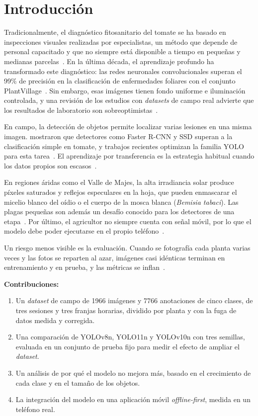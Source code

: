 \documentclass[sensors,article,submit,pdftex,moreauthors]{Definitions/mdpi}
\begin{document}
\section{Introducción}

Tradicionalmente, el diagnóstico fitosanitario del tomate se ha basado en inspecciones visuales realizadas por especialistas, un método que depende de personal capacitado y que no siempre está disponible a tiempo en pequeñas y medianas parcelas~\cite{SENASA2020}. En la última década, el aprendizaje profundo ha transformado este diagnóstico: las redes neuronales convolucionales superan el 99\% de precisión en la clasificación de enfermedades foliares con el conjunto PlantVillage~\cite{Mohanty2016}. Sin embargo, esas imágenes tienen fondo uniforme e iluminación controlada, y una revisión de los estudios con \emph{datasets} de campo real advierte que los resultados de laboratorio son sobreoptimistas~\cite{Jelali2024}.

En campo, la detección de objetos permite localizar varias lesiones en una misma imagen. \citet{Fuentes2017} mostraron que detectores como Faster R-CNN y SSD superan a la clasificación simple en tomate, y trabajos recientes optimizan la familia YOLO para esta tarea~\cite{Zhong2024,Wang2025}. El aprendizaje por transferencia es la estrategia habitual cuando los datos propios son escasos~\cite{Mengesha2025,Yadav2025}.

En regiones áridas como el Valle de Majes, la alta irradiancia solar produce píxeles saturados y reflejos especulares en la hoja, que pueden enmascarar el micelio blanco del oídio o el cuerpo de la mosca blanca (\emph{Bemisia tabaci}). Las plagas pequeñas son además un desafío conocido para los detectores de una etapa~\cite{Zhang2024Jute}. Por último, el agricultor no siempre cuenta con señal móvil, por lo que el modelo debe poder ejecutarse en el propio teléfono~\cite{Shafi2023,Ksibi2022,Das2025}.

Un riesgo menos visible es la evaluación. Cuando se fotografía cada planta varias veces y las fotos se reparten al azar, imágenes casi idénticas terminan en entrenamiento y en prueba, y las métricas se inflan~\cite{Kapoor2023}.

\textbf{Contribuciones:}
\begin{enumerate}[leftmargin=*,labelsep=4.9mm]
\item Un \emph{dataset} de campo de 1966 imágenes y 7766 anotaciones de cinco clases, de tres sesiones y tres franjas horarias, dividido por planta y con la fuga de datos medida y corregida.
\item Una comparación de YOLOv8n, YOLO11n y YOLOv10n con tres semillas, evaluada en un conjunto de prueba fijo para medir el efecto de ampliar el \emph{dataset}.
\item Un análisis de por qué el modelo no mejora más, basado en el crecimiento de cada clase y en el tamaño de los objetos.
\item La integración del modelo en una aplicación móvil \emph{offline-first}, medida en un teléfono real.
\end{enumerate}
\end{document}
